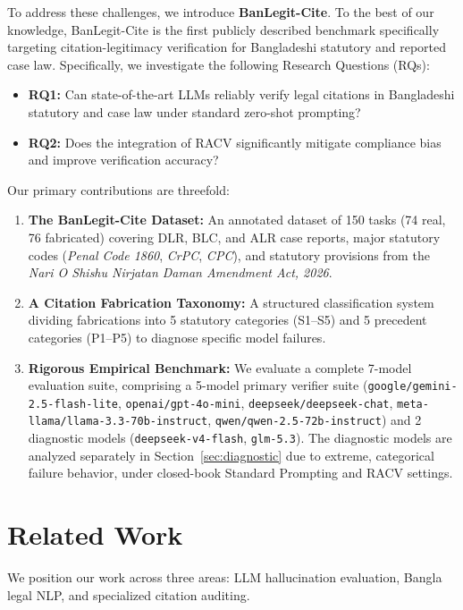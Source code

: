 \documentclass[conference]{IEEEtran}
\begin{document}
To address these challenges, we introduce \textbf{BanLegit-Cite}. To the best of our knowledge, BanLegit-Cite is the first publicly described benchmark specifically targeting citation-legitimacy verification for Bangladeshi statutory and reported case law. Specifically, we investigate the following Research Questions (RQs):
\begin{itemize}
\item \textbf{RQ1:} Can state-of-the-art LLMs reliably verify legal citations in Bangladeshi statutory and case law under standard zero-shot prompting?
\item \textbf{RQ2:} Does the integration of RACV significantly mitigate compliance bias and improve verification accuracy?
\end{itemize}

Our primary contributions are threefold:
\begin{enumerate}
\item \textbf{The BanLegit-Cite Dataset:} An annotated dataset of 150 tasks (74 real, 76 fabricated) covering DLR, BLC, and ALR case reports, major statutory codes (\textit{Penal Code 1860}, \textit{CrPC}, \textit{CPC}), and statutory provisions from the \textit{Nari O Shishu Nirjatan Daman Amendment Act, 2026}.
\item \textbf{A Citation Fabrication Taxonomy:} A structured classification system dividing fabrications into 5 statutory categories (S1--S5) and 5 precedent categories (P1--P5) to diagnose specific model failures.
\item \textbf{Rigorous Empirical Benchmark:} We evaluate a complete 7-model evaluation suite, comprising a 5-model primary verifier suite (\texttt{google/gemini-2.5-flash-lite}, \texttt{openai/gpt-4o-mini}, \texttt{deepseek/deepseek-chat}, \texttt{meta-llama/llama-3.3-70b-instruct}, \texttt{qwen/qwen-2.5-72b-instruct}) and 2 diagnostic models (\texttt{deepseek-v4-flash}, \texttt{glm-5.3}). The diagnostic models are analyzed separately in Section~\ref{sec:diagnostic} due to extreme, categorical failure behavior, under closed-book Standard Prompting and RACV settings.
\end{enumerate}


\section{Related Work}
We position our work across three areas: LLM hallucination evaluation, Bangla legal NLP, and specialized citation auditing.
\end{document}
